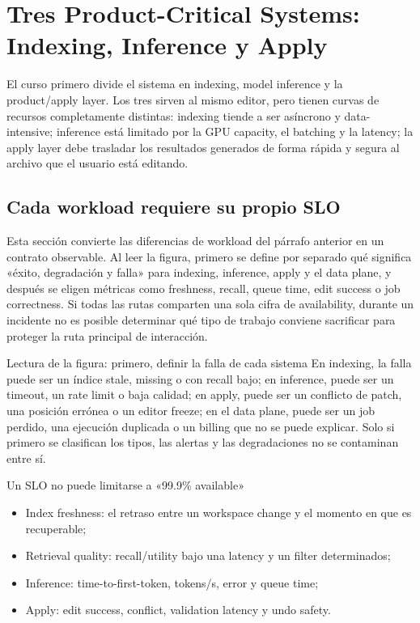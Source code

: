 \section{Tres Product-Critical Systems: Indexing, Inference y Apply}

El curso primero divide el sistema en indexing, model inference y la product/apply layer. Los tres sirven al mismo editor, pero tienen curvas de recursos completamente distintas: indexing tiende a ser asíncrono y data-intensive; inference está limitado por la GPU capacity, el batching y la latency; la apply layer debe trasladar los resultados generados de forma rápida y segura al archivo que el usuario está editando.

\subsection{Cada workload requiere su propio SLO}

Esta sección convierte las diferencias de workload del párrafo anterior en un contrato observable. Al leer la figura, primero se define por separado qué significa «éxito, degradación y falla» para indexing, inference, apply y el data plane, y después se eligen métricas como freshness, recall, queue time, edit success o job correctness. Si todas las rutas comparten una sola cifra de availability, durante un incidente no es posible determinar qué tipo de trabajo conviene sacrificar para proteger la ruta principal de interacción.


\begin{knowledgebox}{Lectura de la figura: primero, definir la falla de cada sistema}
En indexing, la falla puede ser un índice stale, missing o con recall bajo; en inference, puede ser un timeout, un rate limit o baja calidad; en apply, puede ser un conflicto de patch, una posición errónea o un editor freeze; en el data plane, puede ser un job perdido, una ejecución duplicada o un billing que no se puede explicar. Solo si primero se clasifican los tipos, las alertas y las degradaciones no se contaminan entre sí.
\end{knowledgebox}

\begin{importantbox}{Un SLO no puede limitarse a «99.9\% available»}
\begin{itemize}
  \item Index freshness: el retraso entre un workspace change y el momento en que es recuperable;
  \item Retrieval quality: recall/utility bajo una latency y un filter determinados;
  \item Inference: time-to-first-token, tokens/s, error y queue time;
  \item Apply: edit success, conflict, validation latency y undo safety.
\end{itemize}
\end{importantbox}

